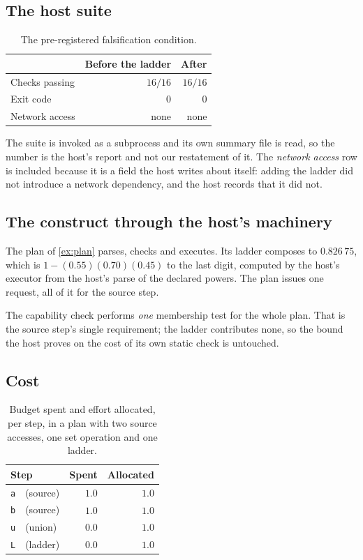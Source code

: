 \documentclass[11pt,twocolumn,a4paper]{article}
\theoremstyle{plain}
\theoremstyle{definition}
\theoremstyle{remark}
\newcommand{\hfq}[1]{\texttt{#1}}
\begin{document}
\subsection{The host suite}

\begin{table}[!htbp]
\centering
\caption{The pre-registered falsification condition.}
\label{tab:hostsuite}
\begin{tabular}{lrr}
\toprule
& Before the ladder & After \\
\midrule
Checks passing      & $16/16$ & $16/16$ \\
Exit code           & $0$     & $0$ \\
Network access      & none    & none \\
\bottomrule
\end{tabular}
\end{table}

The suite is invoked as a subprocess and its own summary file is read, so the
number is the host's report and not our restatement of it. The
\emph{network access} row is included because it is a field the host writes
about itself: adding the ladder did not introduce a network dependency, and the
host records that it did not.

\subsection{The construct through the host's machinery}

The plan of \cref{ex:plan} parses, checks and executes. Its ladder composes to
$0.826\,75$, which is $1-(0.55)(0.70)(0.45)$ to the last digit, computed by the
host's executor from the host's parse of the declared powers. The plan issues
one request, all of it for the source step.

The capability check performs \emph{one} membership test for the whole plan.
That is the source step's single requirement; the ladder contributes none, so
the bound the host proves on the cost of its own static check is untouched.

\subsection{Cost}

\begin{table}[!htbp]
\centering
\caption{Budget spent and effort allocated, per step, in a plan with two source
accesses, one set operation and one ladder.}
\label{tab:cost}
\begin{tabular}{lrr}
\toprule
Step & Spent & Allocated \\
\midrule
\hfq{a}\ \ (source)     & $1.0$ & $1.0$ \\
\hfq{b}\ \ (source)     & $1.0$ & $1.0$ \\
\hfq{u}\ \ (union)      & $0.0$ & $1.0$ \\
\hfq{L}\ \ (ladder)     & $0.0$ & $1.0$ \\
\bottomrule
\end{tabular}
\end{table}
\end{document}
